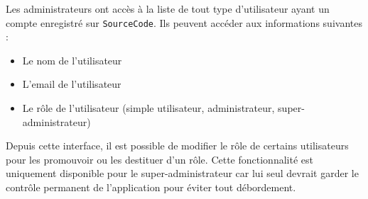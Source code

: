 Les administrateurs ont accès à la liste de tout type d'utilisateur ayant un compte enregistré sur \texttt{SourceCode}. Ils peuvent accéder aux informations suivantes :

\begin{itemize}
    \item Le nom de l'utilisateur
    \item L'email de l'utilisateur
    \item Le rôle de l'utilisateur (simple utilisateur, administrateur, super-administrateur)
\end{itemize}

Depuis cette interface, il est possible de modifier le rôle de certains utilisateurs pour les promouvoir ou les destituer d'un rôle. Cette fonctionnalité est uniquement disponible pour le super-administrateur car lui seul devrait garder le contrôle permanent de l'application pour éviter tout débordement.
